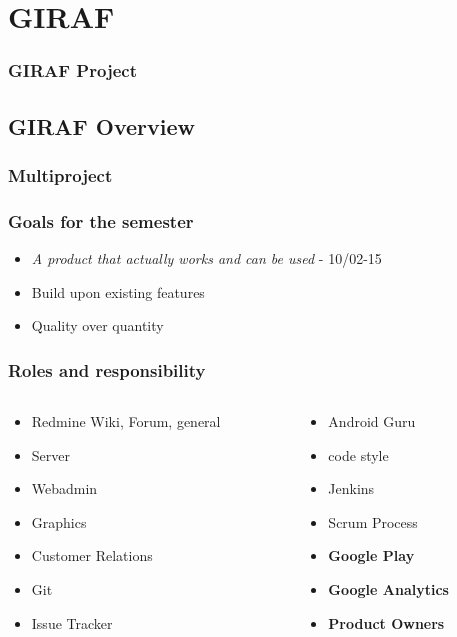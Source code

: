 \section{GIRAF}
\begin{frame}
	\frametitle{GIRAF Project}
\end{frame}

\subsection{GIRAF Overview}

\begin{frame}
  \begin{center}
	\frametitle{Multiproject}
  \end{center}
\end{frame}

\begin{frame}
	\begin{center}
		\frametitle{Goals for the semester}
		\begin{itemize}
			\item \textit{A product that actually works and can be used} - 10/02-15
			\item Build upon existing features
			\item Quality over quantity
		\end{itemize}
	\end{center}
\end{frame}

\begin{frame}
	\frametitle{Roles and responsibility}
	\begin{columns}[T] %
		\begin{column}{.48\textwidth}
			\begin{itemize}
				\item Redmine Wiki, Forum, general
				\item Server
				\item Webadmin
				\item Graphics
				\item Customer Relations
				\item Git
				\item Issue Tracker
			\end{itemize}
		\end{column}%
		\hfill%
		\begin{column}{.48\textwidth}
			\begin{itemize}
				\item Android Guru
				\item code style
				\item Jenkins
				\item Scrum Process
				\item \textbf{Google Play}
				\item \textbf{Google Analytics}
				\item \textbf{Product Owners}
			\end{itemize}
		\end{column}%
	\end{columns}
\end{frame}

